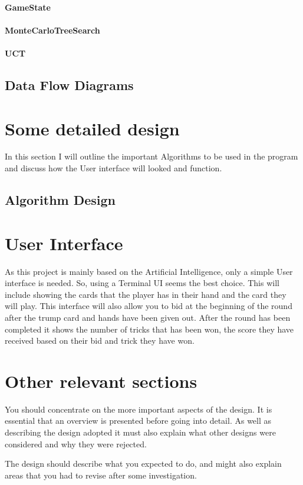 \paragraph{GameState}
\paragraph{MonteCarloTreeSearch}
\paragraph{UCT}

\subsection{Data Flow Diagrams}
\section{Some detailed design}
In this section I will outline the important Algorithms to be used in the program and discuss how the User interface will looked and function.
\subsection{Algorithm Design}
\section{User Interface}
As this project is mainly based on the Artificial Intelligence, only a simple User interface is needed. So, using a Terminal UI seems the best choice. This will include showing the cards that the player has in their hand and the card they will play. This interface will also allow you to bid at the beginning of the round after the trump card and hands have been given out. After the round has been completed it shows the number of tricks that has been won, the score they have received based on their bid and trick they have won.
\section{Other relevant sections}

You should concentrate on the more important aspects of the design. It is essential that an overview is presented before going into detail. As well as describing the design adopted it must also explain what other designs were considered and why they were rejected.

The design should describe what you expected to do, and might also explain areas that you had to revise after some investigation.


